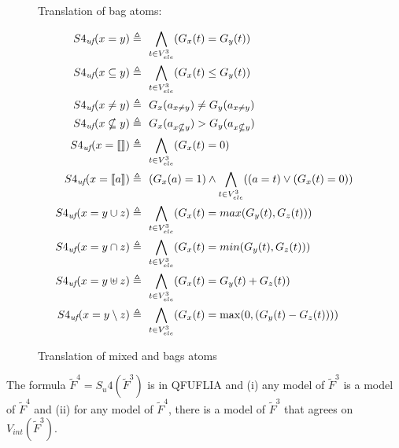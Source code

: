 \begin{figure}
\begin{mdframed}
Translation of bag atoms:

\begin{align*}
 S4_{\textit{uf}}(x = y)           \triangleq &\ \   \underset{t \in V^3_{ele}}{\bigwedge}(G_{x}(t) = G_{y}(t))   \\
 S4_{\textit{uf}}(x \subseteq y)   \triangleq &\ \   \underset{t \in V^3_{ele}}{\bigwedge}(G_{x}(t) \le G_{y}(t))   \\
 S4_{\textit{uf}}(x \neq y)        \triangleq &\ \   G_{x}(a_{x \neq y}) \neq G_{y}(a_{x \neq y})   \\
 S4_{\textit{uf}}(x \nsubseteq y)  \triangleq &\ \   G_{x}(a_{x \nsubseteq y}) > G_{y}(a_{x \nsubseteq y})   \\
 S4_{\textit{uf}}(x = \llbracket  \rrbracket )  \triangleq &\ \   \underset{t\in V^3_{ele}}{\bigwedge}(G_{x}(t) = 0)  \\
 S4_{\textit{uf}}(x = \llbracket a \rrbracket)  \triangleq &\ \   (G_{x}(a) = 1)  \land \underset{t\in V^3_{ele}}{\bigwedge}((a = t) \lor (G_{x}(t) = 0))    \\
 S4_{\textit{uf}}(x = y \cup z)    \triangleq &\ \   \underset{t\in V^3_{ele}}{\bigwedge}(G_{x}(t) = max(G_{y}(t),G_{z}(t)))   \\
 S4_{\textit{uf}}(x = y \cap z)    \triangleq &\ \   \underset{t\in V^3_{ele}}{\bigwedge}(G_{x}(t) = min(G_{y}(t),G_{z}(t)))   \\
 S4_{\textit{uf}}(x = y \uplus z)   \triangleq &\ \   \underset{t\in V^3_{ele}}{\bigwedge}(G_{x}(t) = G_{y}(t)+G_{z}(t))   \\
 S4_{\textit{uf}}(x = y \setminus z) \triangleq &\ \   \underset{t\in V^3_{ele}}{\bigwedge}(G_{x}(t) = \max(0,(G_{y}(t)-G_{z}(t))))
\end{align*}
\caption{Translation of mixed and bags atoms}
\label{fig:SU4}
\end{mdframed}
\end{figure}

\begin{myprop}
\label{prop:final}
The formula $\tilde{F}^4 = S_{u}4(\tilde{F}^3)$ is in QFUFLIA and
(i) any model of $\tilde{F}^3$ is a model of $\tilde{F}^4$ and
(ii) for any model of $\tilde{F}^4$, there is a model of $\tilde{F}^3$ that agrees on $V_{int}(\tilde{F}^3)$.
\end{myprop}

